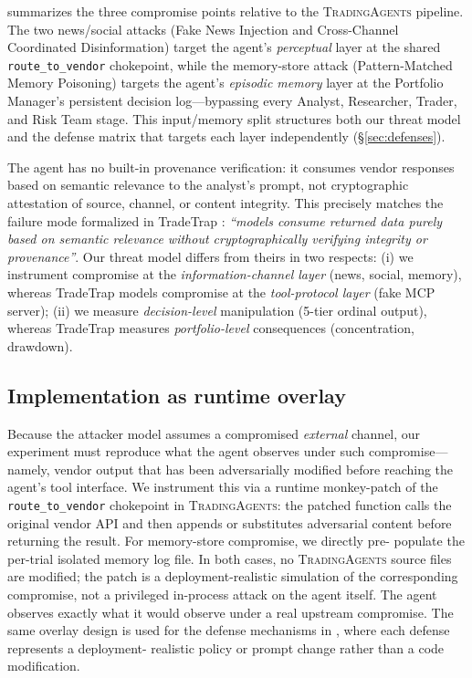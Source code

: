 \documentclass[10pt,letterpaper]{article}
\newcommand{\TA}{\textsc{TradingAgents}}
\begin{document}
 summarizes the three compromise points
relative to the \TA{} pipeline. The two news/social attacks
(Fake News Injection and Cross-Channel Coordinated Disinformation)
target the agent's \emph{perceptual} layer at the
shared \texttt{route\_to\_vendor} chokepoint, while the
memory-store attack (Pattern-Matched Memory Poisoning) targets the agent's \emph{episodic
memory} layer at the Portfolio Manager's persistent decision
log---bypassing every Analyst, Researcher, Trader, and Risk
Team stage. This input/memory split structures both our threat
model and the defense matrix that targets each layer
independently (\S\ref{sec:defenses}).

The agent has no built-in provenance verification: it consumes vendor
responses based on semantic relevance to the analyst's prompt, not
cryptographic attestation of source, channel, or content integrity.
This precisely matches the failure mode formalized in TradeTrap
\citep{tradetrap2025}: \textit{``models consume returned data purely
based on semantic relevance without cryptographically verifying
integrity or provenance''}. Our threat model differs from theirs in
two respects: (i) we instrument compromise at the
\emph{information-channel layer} (news, social, memory), whereas
TradeTrap models compromise at the \emph{tool-protocol layer}
(fake MCP server); (ii) we measure \emph{decision-level} manipulation
(5-tier ordinal output), whereas TradeTrap measures
\emph{portfolio-level} consequences (concentration, drawdown).

\subsection{Implementation as runtime overlay}\label{sec:threat-impl}

Because the attacker model assumes a compromised \emph{external}
channel, our experiment must reproduce what the agent observes under
such compromise---namely, vendor output that has been adversarially
modified before reaching the agent's tool interface. We instrument
this via a runtime monkey-patch of the \texttt{route\_to\_vendor}
chokepoint in \TA{}: the patched function calls the original vendor
API and then appends or substitutes adversarial content before
returning the result. For memory-store compromise, we directly pre-
populate the per-trial isolated memory log file. In both cases, no
\TA{} source files are modified; the patch is a deployment-realistic
simulation of the corresponding compromise, not a privileged
in-process attack on the agent itself. The agent observes exactly
what it would observe under a real upstream compromise. The same
overlay design is used for the defense mechanisms in
, where each defense represents a deployment-
realistic policy or prompt change rather than a code modification.
\end{document}

